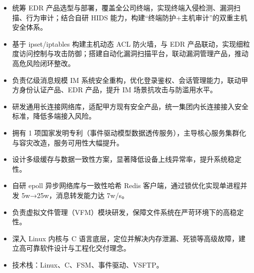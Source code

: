 \begin{itemize}
    \item 统筹 EDR 产品选型与部署，覆盖全公司终端，实现终端入侵检测、漏洞扫描、行为审计；结合自研 HIDS 能力，构建“终端防护+主机审计”的双重主机安全体系。
    \item 基于 ipset/iptables 构建主机动态 ACL 防火墙，与 EDR 产品联动，实现细粒度访问控制与攻击防御；搭建自动化漏洞扫描平台，联动漏洞管理产品，推动高危风险闭环整改。
\end{itemize}

\begin{itemize}
    \item 负责亿级消息规模 IM 系统安全重构，优化登录鉴权、会话管理能力，联动甲方身份认证产品、EDR 产品，提升 IM 场景抗攻击与防滥用水平。
    \item 研发通用长连接网络库，适配甲方现有安全产品，统一集团内长连接接入安全标准，降低多端接入风险。
\end{itemize}

\vspace{0.10cm}


\begin{itemize}
    \item 拥有 1 项国家发明专利（事件驱动模型数据透传服务），主导核心服务集群化与容灾改造，服务可用性大幅提升。
    \item 设计多级缓存与数据一致性方案，显著降低设备上线异常率，提升系统稳定性。
    \item 自研 epoll 异步网络库与一致性哈希 Redis 客户端，通过锁优化实现单进程并发 5w→25w，消息转发能力达 7w/s。
\end{itemize}

\vspace{0.10cm}


\begin{itemize}
    \item 负责虚拟文件管理（VFM）模块研发，保障文件系统在严苛环境下的高稳定性。
    \item 深入 Linux 内核与 C 语言底层，定位并解决内存泄漏、死锁等高级故障，建立高可靠软件设计与工程化交付理念。
    \item 技术栈：Linux、C、FSM、事件驱动、VSFTP。
\end{itemize}


